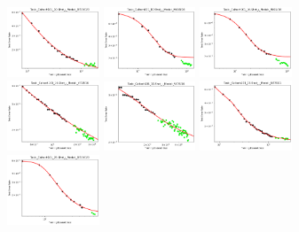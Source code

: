 \documentclass{article} %
\begin{document}
\begin{figure}
\includegraphics[width=0.245\textwidth]{figures/scaling_laws_benchmark_dataset_plots/caltech_10shot___BiT_101_3.png}
\includegraphics[width=0.245\textwidth]{figures/scaling_laws_benchmark_dataset_plots/caltech_10shot___MiX_B_16.png}
\includegraphics[width=0.245\textwidth]{figures/scaling_laws_benchmark_dataset_plots/caltech_10shot___MiX_L_16.png}
\includegraphics[width=0.245\textwidth]{figures/scaling_laws_benchmark_dataset_plots/caltech_10shot___ViT_B_16.png}
\includegraphics[width=0.245\textwidth]{figures/scaling_laws_benchmark_dataset_plots/caltech_10shot___ViT_S_16.png}
\includegraphics[width=0.245\textwidth]{figures/scaling_laws_benchmark_dataset_plots/caltech_25shot___BiT_50_1.png}
\includegraphics[width=0.245\textwidth]{figures/scaling_laws_benchmark_dataset_plots/caltech_25shot___BiT_101_3.png}

\end{figure}
\end{document}
